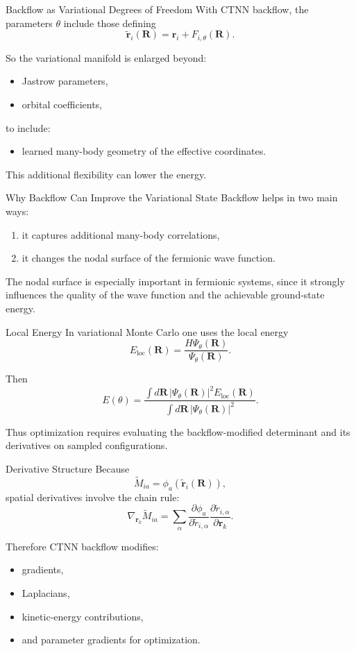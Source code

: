 \documentclass[aspectratio=169]{beamer}
\begin{document}
\begin{frame}{Backflow as Variational Degrees of Freedom}
With CTNN backflow, the parameters \(\theta\) include those defining
\[
\tilde{\mathbf{r}}_i(\mathbf{R})=\mathbf{r}_i+F_{i,\theta}(\mathbf{R}).
\]

So the variational manifold is enlarged beyond:
\begin{itemize}
    \item Jastrow parameters,
    \item orbital coefficients,
\end{itemize}
to include:
\begin{itemize}
    \item learned many-body geometry of the effective coordinates.
\end{itemize}

This additional flexibility can lower the energy.
\end{frame}

\begin{frame}{Why Backflow Can Improve the Variational State}
Backflow helps in two main ways:
\begin{enumerate}
    \item it captures additional many-body correlations,
    \item it changes the nodal surface of the fermionic wave function.
\end{enumerate}

The nodal surface is especially important in fermionic systems, since it strongly influences the quality of the wave function and the achievable ground-state energy.
\end{frame}

\begin{frame}{Local Energy}
In variational Monte Carlo one uses the local energy
\[
E_{\mathrm{loc}}(\mathbf{R})
=
\frac{H\Psi_\theta(\mathbf{R})}{\Psi_\theta(\mathbf{R})}.
\]

Then
\[
E(\theta)
=
\frac{\int d\mathbf{R}\, |\Psi_\theta(\mathbf{R})|^2 E_{\mathrm{loc}}(\mathbf{R})}
{\int d\mathbf{R}\, |\Psi_\theta(\mathbf{R})|^2}.
\]

Thus optimization requires evaluating the backflow-modified determinant and its derivatives on sampled configurations.
\end{frame}

\begin{frame}{Derivative Structure}
Because
\[
\widetilde{M}_{ia}=\phi_a(\tilde{\mathbf{r}}_i(\mathbf{R})),
\]
spatial derivatives involve the chain rule:
\[
\nabla_{\mathbf{r}_k}\widetilde{M}_{ia}
=
\sum_{\alpha}
\frac{\partial \phi_a}{\partial \tilde{r}_{i,\alpha}}
\frac{\partial \tilde{r}_{i,\alpha}}{\partial \mathbf{r}_k}.
\]

Therefore CTNN backflow modifies:
\begin{itemize}
    \item gradients,
    \item Laplacians,
    \item kinetic-energy contributions,
    \item and parameter gradients for optimization.
\end{itemize}
\end{frame}
\end{document}
